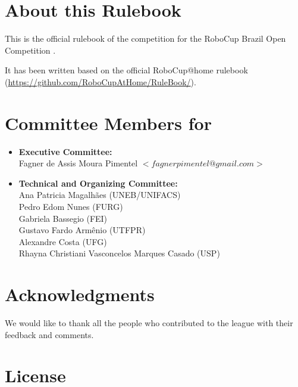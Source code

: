 

\section*{About this Rulebook}  
This is the official rulebook of the \AtHome{} competition for the RoboCup Brazil Open Competition \YEAR.

It has been written based on the official RoboCup@home rulebook (\url{https://github.com/RoboCupAtHome/RuleBook/}). 

\section*{Committee Members for \YEAR}
\begin{itemize}
    \item \textbf{Executive Committee:} \\ Fagner de Assis Moura Pimentel $<fagnerpimentel@gmail.com>$
    \item \textbf{Technical and Organizing Committee:} \\ 
        Ana Patricia Magalhães (UNEB/UNIFACS) \\
        Pedro Edom Nunes (FURG) \\
        Gabriela Bassegio (FEI) \\
        Gustavo Fardo Armênio (UTFPR) \\
        Alexandre Costa (UFG) \\
        Rhayna Christiani Vasconcelos Marques Casado (USP)
\end{itemize}

\section*{Acknowledgments}
\label{sec:acknowledgments}

We would like to thank all the people who contributed to the \AtHome{} league with their feedback and comments.

\vfill

\section*{License}

\doclicenseThis

